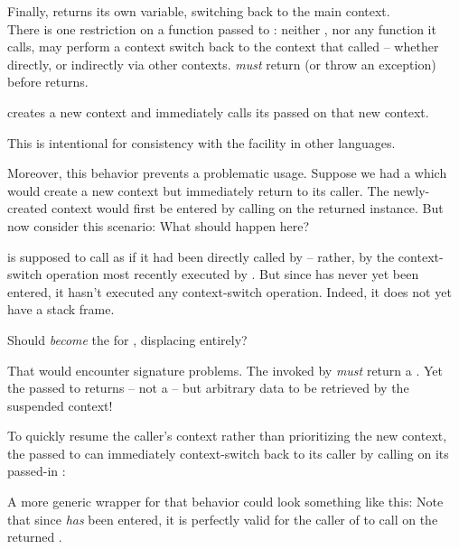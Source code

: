 Finally,  returns its own  variable, switching back to the main
context.\\

There is one restriction on a function  passed to \resumewith:
neither , nor any function it calls, may perform a context switch
back to the context that called \resumewith -- whether directly, or indirectly
via other contexts.  \emph{must} return (or throw an exception)
before \resumewith returns.



\callcc creates a new context and immediately calls its passed \entryfn on
that new context.

This is intentional for consistency with the \cc facility in other
languages.\cite{schemecallcc}\citecomma\cite{rubycallcc}

Moreover, this behavior prevents a problematic usage. Suppose we had
a  which would create a new context but immediately
return to its caller. The newly-created context would first be entered by
calling \resume on the returned \cont instance.
But now consider this scenario:
What should happen here?

\resumewith is supposed to call  as if it had been
directly called by  -- rather, by the context-switch
operation most recently executed by . But
since  has never yet been entered, it hasn't executed
any context-switch operation. Indeed, it does not yet have a stack frame.

Should  \emph{become} the \entryfn
for , displacing  entirely?

That would encounter signature problems. The \entryfn invoked
by \callcc \emph{must} return a \cont. Yet the  passed to \resumewith
returns -- not a \cont -- but arbitrary data to be retrieved by the suspended
context!

To quickly resume the caller's context rather than prioritizing the new
context, the \entryfn passed to \callcc can immediately context-switch back
to its caller by calling \resume on its passed-in \cont:

A more generic wrapper for that behavior could look something like this:
Note that since  \emph{has} been entered, it
is perfectly valid for the caller of  to
call \resumewith on the returned \cont.

